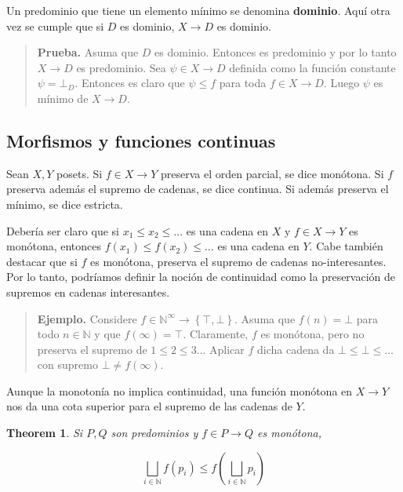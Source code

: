 \documentclass[a4paper, 12pt]{article}
\newtheorem{theorem}{Theorem}
\newtheorem{theorem}{Theorem}
\begin{document}
Un predominio que tiene un elemento mínimo se denomina \textbf{dominio}. Aquí
otra vez se cumple que si $D$ es dominio, $X \to D$ es dominio.

\small
\begin{quote}

\textbf{Prueba.} Asuma que $D$ es dominio. Entonces es predominio y por lo tanto
$X \to D$ es predominio. Sea $\psi \in X \to D$ definida como la función
constante $\psi = \bot_D$. Entonces es claro que $\psi \leq f$ para toda $f \in
X \to D$. Luego $\psi$ es mínimo de $X \to D$.


\end{quote}
\normalsize

\subsection{Morfismos y funciones continuas}

Sean $X, Y$ posets. Si $f \in X \to Y$ preserva el orden parcial, se dice
monótona. Si $f$ preserva además el supremo de cadenas, se dice continua. Si
además preserva el mínimo, se dice estricta.

Debería ser claro que si $x_1 \leq x_2 \leq \ldots$ es una cadena en $X$ y $f
\in X \to Y$ es monótona, entonces $f(x_1) \leq f(x_2) \leq \ldots$ es una
cadena en $Y$. Cabe también destacar que si $f$ es monótona, preserva el supremo
de cadenas no-interesantes. Por lo tanto, podríamos definir la noción de
continuidad como la preservación de supremos en cadenas interesantes.


\small
\begin{quote}

  \textbf{Ejemplo.} Considere $f \in \mathbb{N}^\infty \to \left\{ \top, \bot
  \right\} $. Asuma que $f(n) = \bot $ para todo $n \in \mathbb{N}$ y que
  $f(\infty) = \top$. Claramente, $f$ es monótona, pero no preserva el supremo
  de $1 \leq 2 \leq 3\ldots$ Aplicar $f$ dicha cadena da $\bot  \leq \bot  \leq
  \ldots$ con supremo $\bot \neq f(\infty)$.

\end{quote}
\normalsize

Aunque la monotonía no implica continuidad, una función monótona en $X \to Y$ nos da una cota
superior para el supremo de las cadenas de $Y$.

\begin{theorem}
  Si $P, Q$ son predominios y $f \in P \to Q$ es monótona, 

  \begin{equation*}
    \bigsqcup_{i \in \mathbb{N}} f(p_i) \leq f \left( \bigsqcup_{i \in
    \mathbb{N}} p_i \right) 
  \end{equation*}
\end{theorem}
\end{document}

